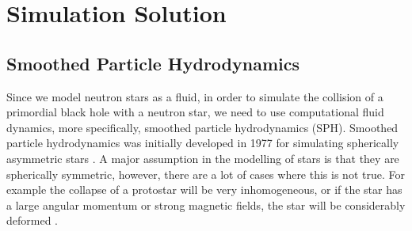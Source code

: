 %
%
% 
%
%
%
%
%

\chapter{Simulation Solution}
\label{chap:sim}

\section{Smoothed Particle Hydrodynamics}

Since we model neutron stars as a fluid, in order to simulate the collision of a primordial black hole with a neutron star, we need to use computational fluid dynamics, more specifically, smoothed particle hydrodynamics (SPH). Smoothed particle hydrodynamics was initially developed in 1977 for simulating spherically asymmetric stars \cite{origsph}. A major assumption in the modelling of stars is that they are spherically symmetric, however, there are a lot of cases where this is not true. For example the collapse of a protostar will be very inhomogeneous, or if the star has a large angular momentum or strong magnetic fields, the star will be considerably deformed \cite{origsph}. \\


